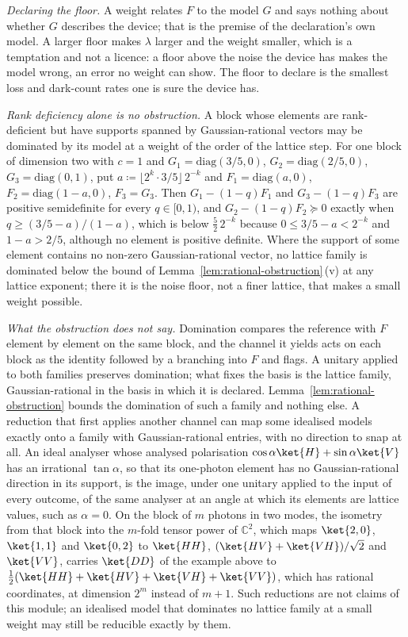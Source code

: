 \begin{remark}
\emph{Declaring the floor.} A weight relates $F$ to the model $G$ and says
nothing about whether $G$ describes the device; that is the premise of the
declaration's own model. A larger floor makes $\lambda$ larger and the
weight smaller, which is a temptation and not a licence: a floor above the
noise the device has makes the model wrong, an error no weight can show. The
floor to declare is the smallest loss and dark-count rates one is sure the
device has.

\emph{Rank deficiency alone is no obstruction.} A block whose elements are
rank-deficient but have supports spanned by Gaussian-rational vectors may be
dominated by its model at a weight of the order of the lattice step. For one
block of dimension two with $c=1$ and
$G_1=\mathrm{diag}(3/5,0)$, $G_2=\mathrm{diag}(2/5,0)$,
$G_3=\mathrm{diag}(0,1)$, put $a\coloneqq\lfloor2^{k}\cdot3/5\rfloor\,2^{-k}$
and $F_1=\mathrm{diag}(a,0)$, $F_2=\mathrm{diag}(1-a,0)$, $F_3=G_3$. Then
$G_1-(1-q)F_1$ and $G_3-(1-q)F_3$ are positive semidefinite for every
$q\in[0,1)$, and $G_2-(1-q)F_2\succeq0$ exactly when
$q\ge(3/5-a)/(1-a)$, which is below $\tfrac52\,2^{-k}$ because
$0\le3/5-a<2^{-k}$ and $1-a>2/5$, although no element is positive definite.
Where the support of some element contains no non-zero Gaussian-rational
vector, no lattice family is dominated below the bound of
Lemma~\ref{lem:rational-obstruction}\,(v) at any lattice exponent; there it
is the noise floor, not a finer lattice, that makes a small weight possible.

\emph{What the obstruction does not say.} Domination compares the reference
with $F$ element by element on the same block, and the channel it yields acts
on each block as the identity followed by a branching into $F$ and flags. A
unitary applied to both families preserves domination; what fixes the basis
is the lattice family, Gaussian-rational in the basis in which it is
declared. Lemma~\ref{lem:rational-obstruction} bounds the domination of such
a family and nothing else. A reduction that first applies another channel can
map some idealised models exactly onto a family with Gaussian-rational
entries, with no direction to snap at all. An ideal analyser whose analysed
polarisation $\cos\alpha\ket{H}+\sin\alpha\ket{V}$ has an irrational
$\tan\alpha$, so that its one-photon element has no Gaussian-rational
direction in its support, is the image, under one unitary applied to the
input of every outcome, of the same analyser at an angle at which its
elements are lattice values, such as $\alpha=0$. On the block of $m$ photons
in two modes, the isometry from that block into the $m$-fold tensor power of
$\mathbb{C}^{2}$, which maps $\ket{2,0}$, $\ket{1,1}$ and $\ket{0,2}$ to
$\ket{HH}$, $(\ket{HV}+\ket{VH})/\sqrt2$ and $\ket{VV}$, carries $\ket{DD}$ of
the example above to $\tfrac12(\ket{HH}+\ket{HV}+\ket{VH}+\ket{VV})$, which
has rational coordinates, at dimension $2^{m}$ instead of $m+1$. Such
reductions are not claims of this module; an idealised model that dominates
no lattice family at a small weight may still be reducible exactly by them.
\end{remark}
